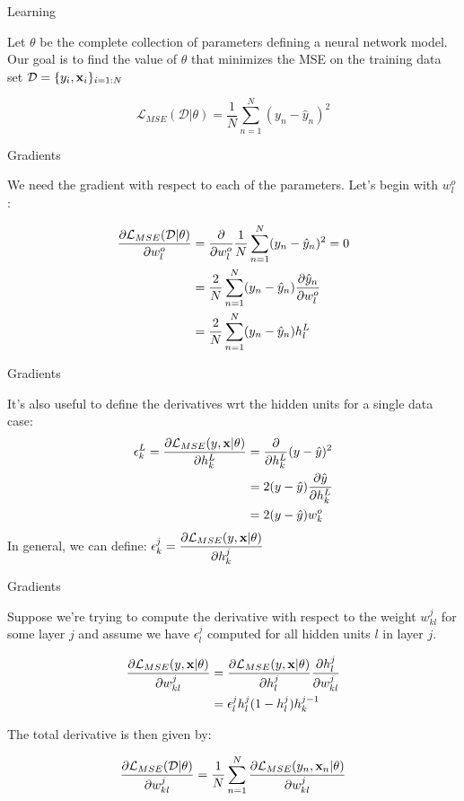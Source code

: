 \documentclass[serif,xcolor=pdftex,dvipsnames,table,hyperref={bookmarks=false,breaklinks}]{beamer}
\begin{document}
\begin{frame}[t]{Learning}

Let $\theta$ be the complete collection of parameters defining a neural network model.
Our goal is to find the value of $\theta$ that minimizes the MSE on the training data
set $\mathcal{D} = \{y_i,{\mathbf{x}}_i\}_{i=1:N}$

$$\mathcal{L}_{MSE}(\mathcal{D}|\theta) =  \frac{1}{N}\sum_{n=1}^N (y_n-\hat{y}_n)^2$$

\end{frame}

\begin{frame}[t]{Gradients}

We need the gradient with respect to each of the parameters. Let's begin with $w_l^o$:

\begin{align}
\frac{\partial{\mathcal{L}_{MSE}(\mathcal{D}|\theta)}}{\partial{w_l^o}} 
&= \frac{\partial{}}{\partial{w_l^o}}\frac{1}{N}\sum_{n=1}^N (y_n-\hat{y}_n)^2=0\\
&=\frac{2}{N}\sum_{n=1}^N (y_n-\hat{y}_n)\frac{\partial{\hat{y}_n}}{\partial{w_l^o}}\\
&=\frac{2}{N}\sum_{n=1}^N (y_n-\hat{y}_n)h^{L}_l
\end{align}

\end{frame}

\begin{frame}[t]{Gradients}

It's also useful to define the derivatives wrt the hidden units for a single data case:
%
\begin{align}
\epsilon^L_k = \frac{\partial{\mathcal{L}_{MSE}(y,{\mathbf{x}}|\theta)}}{\partial{h^L_k}} 
&=\frac{\partial{}}{\partial{h^L_k}}  (y-\hat{y})^2\\
&= 2(y-\hat{y})\frac{\partial{\hat{y}}}{\partial{h_k^L}}\\ 
&= 2(y-\hat{y})w^{o}_k
\end{align}
%
\pause In general, we can define: $\displaystyle \epsilon^j_k = \frac{\partial{\mathcal{L}_{MSE}(y,{\mathbf{x}}|\theta)}}{\partial{h^j_k}}$


\end{frame}


\begin{frame}[t]{Gradients}

Suppose we're trying to compute the derivative with respect to the weight
$w_{kl}^j$ for some layer $j$ and assume we have $\epsilon^{j}_l$ computed for
all hidden units $l$ in layer $j$.

\begin{align}
\frac{\partial{\mathcal{L}_{MSE}(y,{\mathbf{x}}|\theta)}}{\partial{w_{kl}^j}} 
 &= \frac{\partial{\mathcal{L}_{MSE}(y,{\mathbf{x}}|\theta)}}{\partial{h_l^{j}}}\frac{\partial{h_l^{j}}}{\partial{w_{kl}^j}} \\
 &= \epsilon^{j}_l h_l^{j}(1-h_l^{j})h_{k}^{j-1}
\end{align}


\pause The total derivative is then given by:

$$\frac{\partial{\mathcal{L}_{MSE}(\mathcal{D}|\theta)}}{\partial{w_{kl}^j}} =\frac{1}{N}\sum_{n=1}^N\frac{\partial{\mathcal{L}_{MSE}(y_n,{\mathbf{x}}_n|\theta)}}{\partial{w_{kl}^j}} $$

\end{frame}
\end{document}
